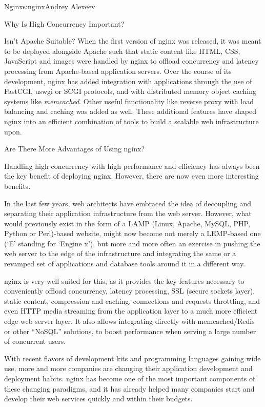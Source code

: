 \begin{aosachapter}{Nginx}{s:nginx}{Andrey Alexeev}
\begin{aosasect1}{Why Is High Concurrency Important?}
\begin{aosasect2}{Isn't Apache Suitable?}
When the first version of nginx was released, it was meant to be
deployed alongside Apache such that static content like HTML, CSS,
JavaScript and images were handled by nginx to offload concurrency and
latency processing from Apache-based application servers. Over the
course of its development, nginx has added integration with
applications through the use of FastCGI, uswgi or SCGI protocols, and
with distributed memory object caching systems like
\emph{memcached}. Other useful functionality like reverse proxy with
load balancing and caching was added as well. These additional
features have shaped nginx into an efficient combination of tools
to build a scalable web infrastructure upon.

\end{aosasect2}

\begin{aosasect2}{Are There More Advantages of Using nginx?}

Handling high concurrency with high performance and efficiency has
always been the key benefit of deploying nginx. However, there
are now even more interesting benefits.

In the last few years, web architects have embraced the idea of
decoupling and separating their application infrastructure from the
web server. However, what would previously exist in the form of a LAMP
(Linux, Apache, MySQL, PHP, Python or Perl)-based website, might now
become not merely a LEMP-based one (`E' standing for `Engine
x'), but more and more often an exercise in pushing the web server to
the edge of the infrastructure and integrating the same or a revamped
set of applications and database tools around it in a different way.

nginx is very well suited for this, as it provides the key features
necessary to conveniently offload concurrency, latency processing, SSL
(secure sockets layer), static content, compression and caching,
connections and requests throttling, and even HTTP media streaming
from the application layer to a much more efficient edge web server
layer. It also allows integrating directly with memcached/Redis or
other ``NoSQL'' solutions, to boost performance when serving a large
number of concurrent users.

With recent flavors of development kits and programming languages
gaining wide use, more and more companies are changing their
application development and deployment habits. nginx has become one of
the most important components of these changing paradigms, and it
has already helped many companies start and develop their web services
quickly and within their budgets.


\end{aosasect2}
\end{aosasect1}
\end{aosachapter}
